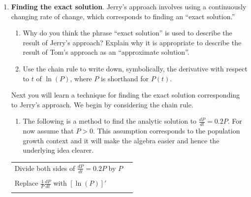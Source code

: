 
\begin{enumerate}[resume]
\item	\textbf{Finding the exact solution}. Jerry's approach involves using a continuously changing rate of change, which corresponds to finding an ``exact solution.'' \label{03problem2}
\begin{enumerate}

\item	Why do you think the phrase ``exact solution'' is used to describe the result of Jerry's approach? Explain why it is appropriate to describe the result of Tom's approach as an ``approximate solution''. \label{03problem2parta}

\vfill
\item Use the chain rule to write down, symbolically, the derivative with respect to $t$ of $\ln (P)$, where $P$ is shorthand for $P(t)$. \label{03problem2partb}
\end{enumerate}
\vfill

\clearpage

Next you will learn a technique for finding the exact solution corresponding to Jerry's approach. We begin by considering the chain rule.

\begin{enumerate}[resume]
\item	 The following is a method to find the analytic solution to $\displaystyle\frac{dP}{dt}= 0.2P$. For now assume that $P > 0$. This assumption corresponds to the population growth context and it will make the algebra easier and hence the underlying idea clearer.  \label{03problem2partc}
 
\end{enumerate}

\begin{center} \renewcommand{\arraystretch}{1.5}
\begin{tabular}{|p{2in}|V|}
\hline

Divide both sides of \newline $\frac{dP}{dt}=0.2P$ by $P$ &
{} \\
{} & {} \\
\hline

Replace $\frac{1}{P}\frac{dP}{dt}$ with $\left[ \ln(P)\right]'$ & 
{} \\
{} & {} \\
\hline
	 

\end{tabular}
\end{center}
\end{enumerate}
